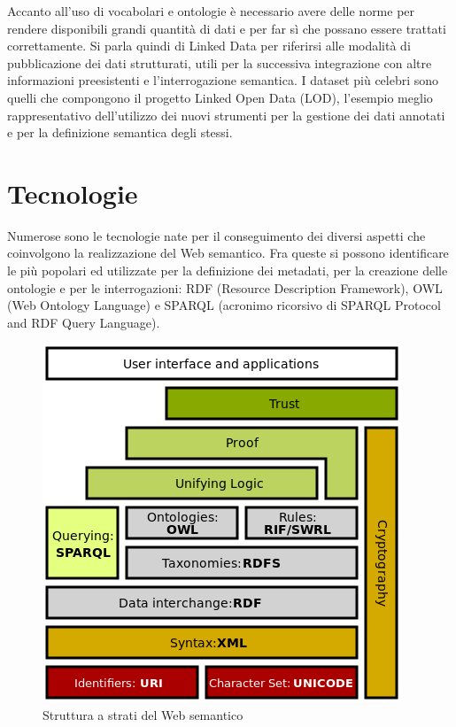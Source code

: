 \documentclass[Lau,binding=0.6cm,noexaminfo,oneside]{sapthesis}
\begin{document}
Accanto all'uso di vocabolari e ontologie è necessario avere delle norme per rendere disponibili grandi quantità di dati e per far sì che possano essere trattati correttamente. Si parla quindi di Linked Data per riferirsi alle modalità di pubblicazione dei dati strutturati, utili per la successiva integrazione con altre informazioni preesistenti e l'interrogazione semantica.
I dataset più celebri sono quelli che compongono il progetto Linked Open Data (LOD), l'esempio meglio rappresentativo dell'utilizzo dei nuovi strumenti per la gestione dei dati annotati e per la definizione semantica degli stessi.\medskip

\section{Tecnologie}

Numerose sono le tecnologie nate per il conseguimento dei diversi aspetti che coinvolgono la realizzazione del Web semantico. Fra queste si possono identificare le più popolari ed utilizzate per la definizione dei metadati, per la creazione delle ontologie e per le interrogazioni: RDF (Resource Description Framework), OWL (Web Ontology Language) e SPARQL (acronimo ricorsivo di SPARQL Protocol and RDF Query Language).\medskip

\begin{figure}[!ht]
  \centering
  \includegraphics[scale=0.45]{pila.png}
  \caption{Struttura a strati del Web semantico}
\end{figure}
\end{document}
